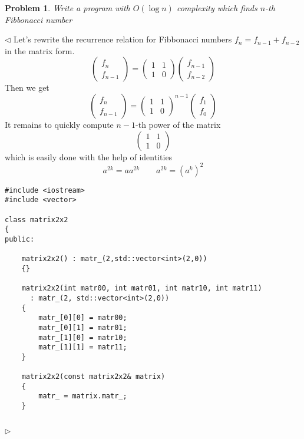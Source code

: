 \documentclass[12pt]{article}
\newtheorem{problem}{Problem}[subsection]
\newenvironment{solution}{\par $\triangleleft$}{$\triangleright$}
\begin{document}
\begin{problem} Write a program with $O(\log n)$ complexity which finds $n$-th
Fibbonacci number
\end{problem}
\begin{solution} Let's rewrite the recurrence relation for Fibbonacci numbers
    $f_n=f_{n-1}+f_{n-2}$ in the matrix form.
    $$
        \begin{pmatrix}
            f_n \\
            f_{n-1}\end{pmatrix}
        =
        \begin{pmatrix}
            1 & 1 \\
            1 & 0
        \end{pmatrix}
        \begin{pmatrix}
            f_{n-1} \\
            f_{n-2}
        \end{pmatrix}
    $$
    Then we get
    $$
        \begin{pmatrix}
            f_n \\
            f_{n-1}
        \end{pmatrix}
        =\begin{pmatrix}
            1 & 1 \\
            1 & 0
        \end{pmatrix}^{n-1}
        \begin{pmatrix}
            f_1 \\ f_0
        \end{pmatrix}
    $$
    It remains to quickly compute $n-1$-th power of the matrix
    $$
        \begin{pmatrix} 1 & 1\\ 1 & 0\end{pmatrix}
    $$
    which is easily done with the help of identities
    $$
        a^{2k}=a a^{2k}\qquad a^{2k}={(a^k)}^2
    $$
    \begin{verbatim}
#include <iostream>
#include <vector>

class matrix2x2
{
public:

    matrix2x2() : matr_(2,std::vector<int>(2,0))
    {}

    matrix2x2(int matr00, int matr01, int matr10, int matr11)
      : matr_(2, std::vector<int>(2,0))
    {
        matr_[0][0] = matr00;
        matr_[0][1] = matr01;
        matr_[1][0] = matr10;
        matr_[1][1] = matr11;
    }

    matrix2x2(const matrix2x2& matrix)
    {
        matr_ = matrix.matr_;
    }


\end{verbatim}
\end{solution}
\end{document}
